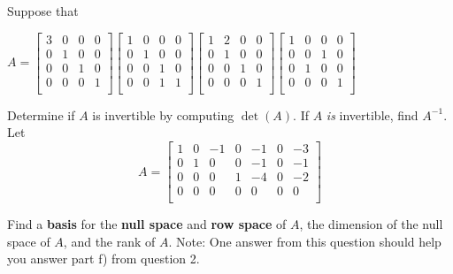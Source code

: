 \documentclass[11pt]{exam}
\begin{document}
\begin{questions}

\newpage
\addpoints
\question[20]

Suppose that 

$A= 
\begin{bmatrix}
3 & 0 & 0  & 0\\
0 & 1 & 0  & 0\\
0 & 0 & 1  & 0\\
0 & 0 & 0  & 1\\
\end{bmatrix}
\begin{bmatrix}
1 & 0 & 0 & 0\\
0 & 1 & 0 & 0\\
0 & 0 & 1 & 0 \\
0 & 0 & 1 & 1\\
\end{bmatrix}
\begin{bmatrix}
1 & 2 & 0 & 0\\
0 & 1 & 0 & 0\\
0 & 0 & 1 & 0\\
0 & 0 & 0 & 1\\
\end{bmatrix}
\begin{bmatrix}
1 & 0 & 0 & 0\\
0 & 0 & 1 & 0\\
0 & 1 & 0 & 0\\
0 & 0 & 0 & 1 \\
\end{bmatrix}
$

Determine if $A$ is invertible by computing $\det(A)$. If $A$ \textit{is} invertible, find $A^{-1}$. 
\newpage
\addpoints
\question[20]
Let 
$$
A
=
\begin{bmatrix}
1 & 0 & -1 & 0 & -1 & 0 & -3 \\
0 & 1 & 0 & 0 & -1 & 0 & -1 \\
0 & 0 & 0 & 1 & -4 & 0 & -2 \\
0 & 0 & 0 & 0 & 0 & 0 & 0 \\
\end{bmatrix}
$$

Find a \textbf{basis} for the \textbf{null space} and \textbf{row space} of $A$, the dimension of the null space of $A$, and the rank of $A$.  Note: One answer from this question should help you answer part f) from question 2. 



\end{questions}

\end{document}
